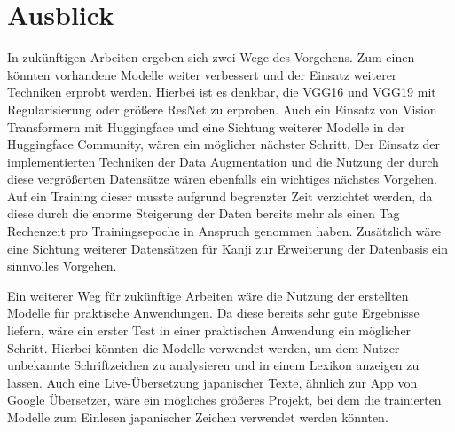 \documentclass[twoside,a4paper]{IEEEtran}
\begin{document}
\section{Ausblick}
In zukünftigen Arbeiten ergeben sich zwei Wege des Vorgehens. Zum einen könnten vorhandene Modelle weiter verbessert und der Einsatz weiterer Techniken erprobt werden. Hierbei ist es denkbar, die VGG16 und VGG19 mit Regularisierung oder größere ResNet zu erproben. Auch ein Einsatz von Vision Transformern mit Huggingface und eine Sichtung weiterer Modelle in der Huggingface Community, wären ein möglicher nächster Schritt. Der Einsatz der implementierten Techniken der Data Augmentation und die Nutzung der durch diese vergrößerten Datensätze wären ebenfalls ein wichtiges nächstes Vorgehen. Auf ein Training dieser musste aufgrund begrenzter Zeit verzichtet werden, da diese durch die enorme Steigerung der Daten bereits mehr als einen Tag Rechenzeit pro Trainingsepoche in Anspruch genommen haben. Zusätzlich wäre eine Sichtung weiterer Datensätzen für Kanji zur Erweiterung der Datenbasis ein sinnvolles Vorgehen.

Ein weiterer Weg für zukünftige Arbeiten wäre die Nutzung der erstellten Modelle für praktische Anwendungen. Da diese bereits sehr gute Ergebnisse liefern, wäre ein erster Test in einer praktischen Anwendung ein möglicher Schritt. Hierbei könnten die Modelle verwendet werden, um dem Nutzer unbekannte Schriftzeichen zu analysieren und in einem Lexikon anzeigen zu lassen. Auch eine Live-Übersetzung japanischer Texte, ähnlich zur App von Google Übersetzer, wäre ein mögliches größeres Projekt, bei dem die trainierten Modelle zum Einlesen japanischer Zeichen verwendet werden könnten.



%
%
\end{document}
